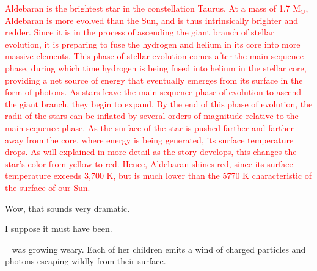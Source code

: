 \documentclass[main.tex]{subfiles}
\begin{document}
\begin{tcolorbox}[sharp corners, colback=red!30, colframe=red!80!blue, title=Aldebaran]
\par \textcolor{red} {Aldebaran is the brightest star in the constellation Taurus.  At a mass of 1.7 M$_{\odot}$, Aldebaran is more evolved than the Sun, and is thus intrinsically brighter and redder.  Since it is in the process of ascending the giant branch of stellar evolution, it is preparing to fuse the hydrogen and helium in its core into more massive elements.  This phase of stellar evolution comes after the main-sequence phase, during which time hydrogen is being fused into helium in the stellar core, providing a net source of energy that eventually emerges from its surface in the form of photons.   As stars leave the main-sequence phase of evolution to ascend the giant branch, they begin to expand.  By the end of this phase of evolution, the radii of the stars can be inflated by several orders of magnitude relative to the main-sequence phase.  As the surface of the star is pushed farther and farther away from the core, where energy is being generated, its surface temperature drops.  As will explained in more detail as the story develops, this changes the star's color from yellow to red.  Hence, Aldebaran shines red, since its surface temperature exceeds 3,700 K, but is much lower than the 5770 K characteristic of the surface of our Sun.}
\end{tcolorbox}

\par \Maia Wow, that sounds very dramatic.

\par \Pleione I suppose it must have been.

\par \nar \rmpleione~ was growing weary.  Each of her children emits a wind of charged particles and photons escaping wildly from their surface.
\end{document}
